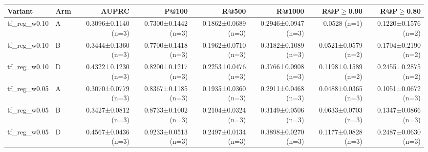 \begin{tabular}{llrrrrrr}
\toprule
Variant & Arm & AUPRC & P@100 & R@500 & R@1000 & R@P$\geq$0.90 & R@P$\geq$0.80 \\
\midrule
tf\_reg\_w0.10 & A & 0.3096±0.1140 (n=3) & 0.7300±0.1442 (n=3) & 0.1862±0.0689 (n=3) & 0.2946±0.0947 (n=3) & 0.0528 (n=1) & 0.1220±0.1576 (n=2) \\
tf\_reg\_w0.10 & B & 0.3444±0.1360 (n=3) & 0.7700±0.1418 (n=3) & 0.1962±0.0710 (n=3) & 0.3182±0.1089 (n=3) & 0.0521±0.0579 (n=2) & 0.1704±0.2190 (n=2) \\
tf\_reg\_w0.10 & D & 0.4322±0.1230 (n=3) & 0.8200±0.1217 (n=3) & 0.2253±0.0476 (n=3) & 0.3766±0.0908 (n=3) & 0.1198±0.1589 (n=2) & 0.2455±0.2875 (n=2) \\
tf\_reg\_w0.05 & A & 0.3070±0.0779 (n=3) & 0.8367±0.1185 (n=3) & 0.1935±0.0360 (n=3) & 0.2911±0.0468 (n=3) & 0.0488±0.0365 (n=3) & 0.1051±0.0672 (n=3) \\
tf\_reg\_w0.05 & B & 0.3427±0.0812 (n=3) & 0.8733±0.1002 (n=3) & 0.2104±0.0324 (n=3) & 0.3149±0.0506 (n=3) & 0.0633±0.0703 (n=3) & 0.1347±0.0866 (n=3) \\
tf\_reg\_w0.05 & D & 0.4567±0.0436 (n=3) & 0.9233±0.0513 (n=3) & 0.2497±0.0134 (n=3) & 0.3898±0.0270 (n=3) & 0.1177±0.0828 (n=3) & 0.2487±0.0630 (n=3) \\
\bottomrule
\end{tabular}
